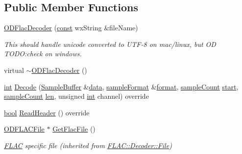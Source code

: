\subsection*{Public Member Functions}
\begin{DoxyCompactItemize}
\item 
\hyperlink{class_o_d_flac_decoder_a6c8ad280251f0d7ded5b436453adf710}{O\+D\+Flac\+Decoder} (\hyperlink{getopt1_8c_a2c212835823e3c54a8ab6d95c652660e}{const} wx\+String \&file\+Name)
\begin{DoxyCompactList}\small\item\em This should handle unicode converted to U\+T\+F-\/8 on mac/linux, but OD T\+O\+DO\+:check on windows. \end{DoxyCompactList}\item 
virtual \hyperlink{class_o_d_flac_decoder_a533d153ae364bf74e75f859a843b221e}{$\sim$\+O\+D\+Flac\+Decoder} ()
\item 
\hyperlink{xmltok_8h_a5a0d4a5641ce434f1d23533f2b2e6653}{int} \hyperlink{class_o_d_flac_decoder_a5a69610efd606948ab6fad4de6489d87}{Decode} (\hyperlink{class_sample_buffer}{Sample\+Buffer} \&\hyperlink{lib_2expat_8h_ac39e72a1de1cb50dbdc54b08d0432a24}{data}, \hyperlink{include_2audacity_2_types_8h_a9938d2e2f6adef23e745cd80ef379792}{sample\+Format} \&\hyperlink{_export_p_c_m_8cpp_a317afff57d87a89158c2b038d37b2b08}{format}, \hyperlink{include_2audacity_2_types_8h_afa427e1f521ea5ec12d054e8bd4d0f71}{sample\+Count} \hyperlink{seqread_8c_ac503262ae470564980711da4f78b1181}{start}, \hyperlink{include_2audacity_2_types_8h_afa427e1f521ea5ec12d054e8bd4d0f71}{sample\+Count} \hyperlink{lib_2expat_8h_af86d325fecfc8f47b61fbf5a5146f582}{len}, unsigned \hyperlink{xmltok_8h_a5a0d4a5641ce434f1d23533f2b2e6653}{int} channel) override
\item 
\hyperlink{mac_2config_2i386_2lib-src_2libsoxr_2soxr-config_8h_abb452686968e48b67397da5f97445f5b}{bool} \hyperlink{class_o_d_flac_decoder_aa7ec1989b475fd07f1d6ad7d1640d0e3}{Read\+Header} () override
\item 
\hyperlink{class_o_d_f_l_a_c_file}{O\+D\+F\+L\+A\+C\+File} $\ast$ \hyperlink{class_o_d_flac_decoder_a82bfdb7be71d118b0979d685a49d0c1c}{Get\+Flac\+File} ()
\begin{DoxyCompactList}\small\item\em \hyperlink{namespace_f_l_a_c}{F\+L\+AC} specific file (inherited from \hyperlink{class_f_l_a_c_1_1_decoder_1_1_file}{F\+L\+A\+C\+::\+Decoder\+::\+File}) \end{DoxyCompactList}\end{DoxyCompactItemize}
